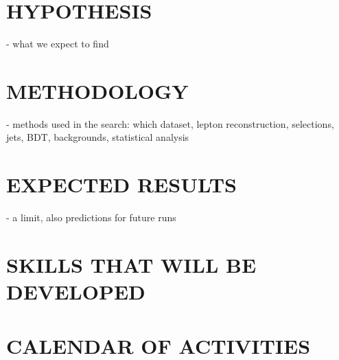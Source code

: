 \documentclass[final,3p]{CSP}
\begin{document}

\section{HYPOTHESIS}
- what we expect to find

\section{METHODOLOGY}
- methods used in the search: which dataset,  lepton reconstruction, selections, jets, BDT, backgrounds, statistical analysis

\section{EXPECTED RESULTS}
- a limit, also predictions for future runs


\cleardoublepage



\appendix
\section{SKILLS THAT WILL BE DEVELOPED}

\section{CALENDAR OF ACTIVITIES}
\end{document}

